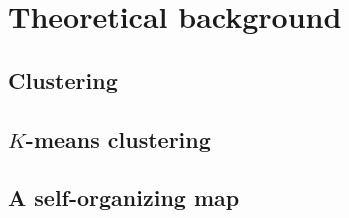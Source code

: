 \section{Theoretical background}
\label{sec:theoretical-background}
\subsection{Clustering}
\subsection{$K$-means clustering}
\subsection{A self-organizing map}